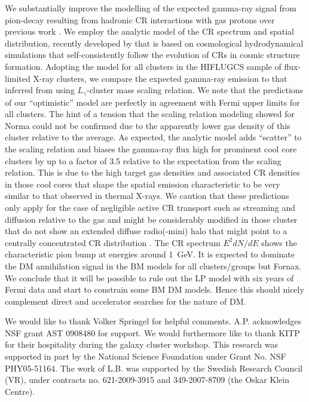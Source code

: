 \documentclass[10pt,aps,pra,reprint,amsmath,amsfonts,amssymb,showpacs,nofootinbib,floatfix]{revtex4-1}
\begin{document}
We substantially improve the modelling of the expected gamma-ray
signal from pion-decay resulting from hadronic CR interactions with
gas protons over previous work \citep{2010ApJ...717L..71A}. We employ
the analytic model of the CR spectrum and spatial distribution,
recently developed by \citet{2010MNRAS.409..449P} that is based on
cosmological hydrodynamical simulations that self-consistently follow
the evolution of CRs in cosmic structure formation. Adopting the model
for all clusters in the HIFLUGCS sample of flux-limited X-ray
clusters, we compare the expected gamma-ray emission to that inferred
from using $L_\gamma$-cluster mass scaling relation. We note that the
predictions of our ``optimistic'' model are perfectly in agreement
with Fermi upper limits for all clusters.  The hint of a tension that
the scaling relation modeling showed for Norma
\citep{2010ApJ...717L..71A} could not be confirmed due to the
apparently lower gas density of this cluster relative to the average.
As expected, the analytic model adds ``scatter'' to the scaling
relation and biases the gamma-ray flux high for prominent cool core
clusters by up to a factor of 3.5 relative to the expectation from the
scaling relation. This is due to the high target gas densities and
associated CR densities in those cool cores that shape the spatial
emission characteristic to be very similar to that observed in thermal
X-rays. We caution that these predictions only apply for the case of
negligible active CR transport such as streaming and diffusion
relative to the gas and might be considerably modified in those
cluster that do not show an extended diffuse radio(-mini) halo that
might point to a centrally concentrated CR distribution
\citep{2011A&A...527A..99E}. The CR spectrum $E^2 dN/dE$ shows the
characteristic pion bump at energies around 1~GeV. It is expected to
dominate the DM annihilation signal in the BM models for all
clusters/groups but Fornax. We conclude that it will be possible to
rule out the LP model with six years of Fermi data and start to
constrain some BM DM models. Hence this should nicely complement
direct and accelerator searches for the nature of DM.






\smallskip We would like to thank Volker Springel for helpful
comments.  A.P. acknowledges NSF grant AST 0908480 for support. We
would furthermore like to thank KITP for their hospitality during the
galaxy cluster workshop.  This research was supported in part by the
National Science Foundation under Grant No. NSF PHY05-51164. The work
of L.B. was supported by the Swedish Research Council (VR), under
contracts no. 621-2009-3915 and 349-2007-8709 (the Oskar Klein
Centre).
\end{document}
